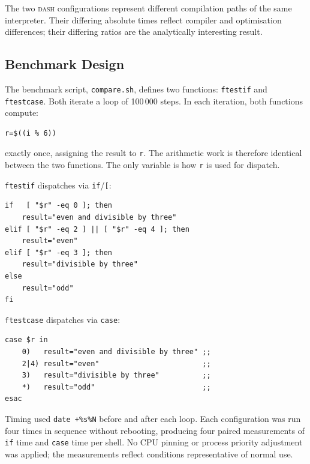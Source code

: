 \documentclass[11pt,a4paper]{article}
\begin{document}
The two \textsc{dash} configurations represent different compilation
paths of the same interpreter.
Their differing absolute times reflect compiler and optimisation
differences; their differing ratios are the analytically interesting
result.

\subsection{Benchmark Design}

The benchmark script, \texttt{compare.sh}, defines two functions:
\texttt{ftestif} and \texttt{ftestcase}.
Both iterate a loop of 100\,000 steps.
In each iteration, both functions compute:

\begin{lstlisting}[numbers=none,frame=none,aboveskip=2pt,belowskip=2pt]
r=$((i % 6))
\end{lstlisting}

\noindent
exactly once, assigning the result to \texttt{r}.
The arithmetic work is therefore identical between the two functions.
The only variable is how \texttt{r} is used for dispatch.

\texttt{ftestif} dispatches via \texttt{if}/\texttt{[}:

\begin{lstlisting}[numbers=none,frame=none,aboveskip=2pt,belowskip=2pt]
if   [ "$r" -eq 0 ]; then
    result="even and divisible by three"
elif [ "$r" -eq 2 ] || [ "$r" -eq 4 ]; then
    result="even"
elif [ "$r" -eq 3 ]; then
    result="divisible by three"
else
    result="odd"
fi
\end{lstlisting}

\texttt{ftestcase} dispatches via \texttt{case}:

\begin{lstlisting}[numbers=none,frame=none,aboveskip=2pt,belowskip=2pt]
case $r in
    0)   result="even and divisible by three" ;;
    2|4) result="even"                        ;;
    3)   result="divisible by three"          ;;
    *)   result="odd"                         ;;
esac
\end{lstlisting}

Timing used \texttt{date~+\%s\%N} before and after each loop.
Each configuration was run four times in sequence without rebooting,
producing four paired measurements of \texttt{if} time and
\texttt{case} time per shell.
No CPU pinning or process priority adjustment was applied; the
measurements reflect conditions representative of normal use.
\end{document}
